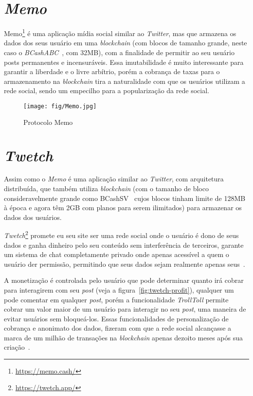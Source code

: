\section{\textit{Memo}}

Memo\footnote{\url{https://memo.cash/}} é uma aplicação mídia social similar ao \textit{Twitter}, mas que armazena os dados dos seus usuário em uma \textit{blockchain} (com blocos de tamanho grande, neste caso o \textit{BCashABC}~\cite{BTCABC}, com 32MB), com a finalidade de permitir ao seu usuário posts permanentes e incensuráveis.
Essa imutabilidade é muito interessante para garantir a liberdade e o livre arbítrio, porém a cobrança de taxas para o armazenamento na \textit{blockchain} tira a naturalidade com que os usuários utilizam a rede social, sendo um empecilho para a popularização da rede social.

\begin{figure}[H]
    \centering
    \texttt{[image: fig/Memo.jpg]}
    \caption[Protocolo Memo]{\label{fig:memo-protocol}
        Protocolo Memo~\cite{Memo1}
    }
\end{figure}

\section{\textit{Twetch}}

Assim como o \textit{Memo} é uma aplicação similar ao \textit{Twitter}, com arquitetura distribuída, que também utiliza \textit{blockchain} (com o tamanho de bloco consideravelmente grande como BCashSV~\cite{BTCSV} cujos blocos tinham limite de 128MB à época e agora têm 2GB com planos para serem ilimitados) para armazenar os dados dos usuários.

\textit{Twetch}\footnote{\url{https://twetch.app/}} promete eu seu site ser uma rede social onde o usuário é dono de seus dados e ganha dinheiro pelo seu conteúdo sem interferência de terceiros, garante um sistema de chat completamente privado onde apenas acessível a quem o usuário der permissão, permitindo que seus dados sejam realmente apenas seus~\cite{Twetch1}.

A monetização é controlada pelo usuário que pode determinar quanto irá cobrar para interagirem com seu \textit{post} (veja a figura~\ref{fig:twetch-profit}), qualquer um pode comentar em qualquer \textit{post}, porém a funcionalidade \textit{TrollToll} permite cobrar um valor maior de um usuário para interagir no seu \textit{post}, uma maneira de evitar usuários sem bloqueá-los.
Essas funcionalidades de personalização de cobrança e anonimato dos dados, fizeram com que a rede social alcançasse a marca de um milhão de transações na \textit{blockchain} apenas dezoito meses após sua criação~\cite{Twetch2}.

